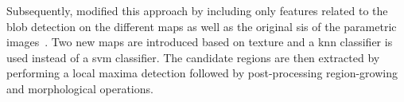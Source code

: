 Subsequently, \citeauthor{Litjens2012} modified this approach by including only
features related to the blob detection on the different maps as well as the
original \acp{si} of the parametric images~\cite{Litjens2012}.
Two new maps are introduced based on texture and a \ac{knn} classifier is used
instead of a \ac{svm} classifier.
The candidate regions are then extracted by performing a local maxima detection
followed by post-processing region-growing and morphological operations.
